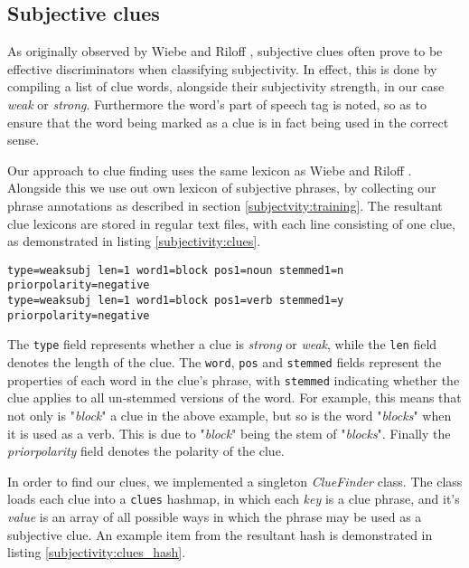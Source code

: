 \subsection{Subjective clues}

As originally observed by Wiebe and Riloff \cite{Wiebe:2000ub}, subjective clues often prove to be effective discriminators when classifying subjectivity. In effect, this is done by compiling a list of clue words, alongside their subjectivity strength, in our case \emph{weak} or \emph{strong}. Furthermore the word's part of speech tag is noted, so as to ensure that the word being marked as a clue is in fact being used in the correct sense.

Our approach to clue finding uses the same lexicon as Wiebe and Riloff \cite{Wiebe:2000ub}. Alongside this we use out own lexicon of subjective phrases, by collecting our phrase annotations as described in section \ref{subjectvity:training}. The resultant clue lexicons are stored in regular text files, with each line consisting of one clue, as demonstrated in listing \ref{subjectivity:clues}.

\begin{lstlisting}[numbers=none, caption={Example clue from the subjective clue lexicon}, label=subjectivity:clues]
type=weaksubj len=1 word1=block pos1=noun stemmed1=n priorpolarity=negative
type=weaksubj len=1 word1=block pos1=verb stemmed1=y priorpolarity=negative
\end{lstlisting}

The \texttt{type} field represents whether a clue is \emph{strong} or \emph{weak}, while the \texttt{len} field denotes the length of the clue. The \texttt{word}, \texttt{pos} and \texttt{stemmed} fields represent the properties of each word in the clue's phrase, with \texttt{stemmed} indicating whether the clue applies to all un-stemmed versions of the word. For example, this means that not only is "\emph{block}" a clue in the above example, but so is the word "\emph{blocks}" when it is used as a verb. This is due to "\emph{block}" being the stem of "\emph{blocks}". Finally the \emph{priorpolarity} field denotes the polarity of the clue.

In order to find our clues, we implemented a singleton \emph{ClueFinder} class. The class loads each clue into a \texttt{clues} hashmap, in which each \emph{key} is a clue phrase, and it's \emph{value} is an array of all possible ways in which the phrase may be used as a subjective clue. An example item from the resultant hash is demonstrated in listing \ref{subjectivity:clues_hash}.

